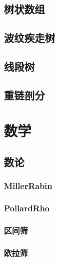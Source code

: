 \documentclass{article}
\begin{document}
\begin{multicols*}{3}
\subsection{树状数组}


\subsection{波纹疾走树}


\subsection{线段树}


\subsection{重链剖分}


\section{数学}
\subsection{数论}
\subsubsection{MillerRabin}


\subsubsection{PollardRho}


\subsubsection{区间筛}


\subsubsection{欧拉筛}



\end{multicols*}
\end{document}
